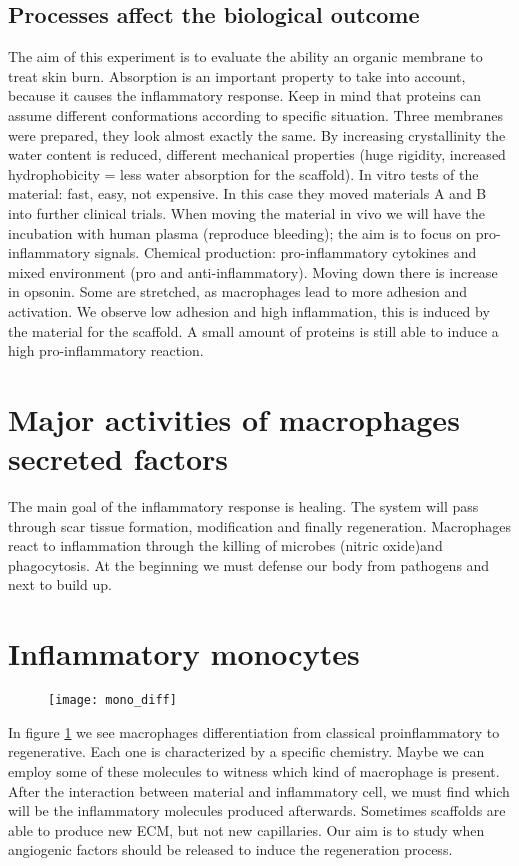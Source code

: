 \subsection{Processes affect the biological outcome}
The aim of this experiment is to evaluate the ability an organic membrane to treat skin burn. Absorption is an important property to take into account, because it causes the inflammatory response. 
Keep in mind that proteins can assume different conformations according to specific situation. Three membranes were prepared, they look almost exactly the same. 
By increasing crystallinity the water content is reduced, different mechanical properties (huge rigidity, increased hydrophobicity = less water absorption for the scaffold). 
In vitro tests of the material: fast, easy, not expensive. 
In this case they moved materials A and B into further clinical trials. When moving the material in vivo we will have the incubation with human plasma (reproduce bleeding); the aim is to focus on pro-inflammatory signals.
Chemical production: pro-inflammatory cytokines and mixed environment (pro and anti-inflammatory). Moving down there is increase in opsonin.  Some are stretched, as macrophages lead to more adhesion and activation. 
We observe low adhesion and high inflammation, this is induced by the material for the scaffold. A small amount of proteins is still able to induce a high pro-inflammatory reaction. 

\section{Major activities of macrophages secreted factors}
The main goal of the inflammatory response is healing. 
The system will pass through scar tissue formation, modification and finally regeneration. Macrophages react to inflammation through the killing of microbes (nitric oxide)and phagocytosis. 
At the beginning we must defense our body from pathogens and next to build up.

\section{Inflammatory monocytes}
\begin{figure}[h]
\texttt{[image: mono\_diff]}
\caption{\label{fig:mono}}
\end{figure}
In figure \ref{fig:mono} we see macrophages differentiation from classical proinflammatory to regenerative. 
Each one is characterized by a specific chemistry. 
Maybe we can employ some of these molecules to witness which kind of macrophage is present. After the interaction between material and inflammatory cell, we must find which will be the inflammatory molecules produced afterwards. 
Sometimes scaffolds are able to produce new ECM, but not new capillaries. 
Our aim is to study when angiogenic factors should be released to induce the regeneration process. 
 

